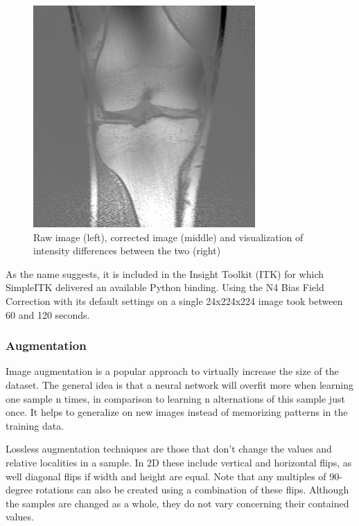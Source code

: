 \begin{figure}[H]
\endminipage\hfill
{}%
  \includegraphics[width=\linewidth]{imgs/diff2.jpg}
\endminipage
\caption{Raw image (left), corrected image (middle) and visualization of intensity differences between the two (right)}
\end{figure}

As the name suggests, it is included in the Insight Toolkit (ITK) for which SimpleITK delivered an available Python binding. Using the N4 Bias Field Correction with its default settings on a single 24x224x224 image took between 60 and 120 seconds.

\subsubsection{Augmentation}

Image augmentation is a popular approach to virtually increase the size of the dataset. The general idea is that a neural network will overfit more when learning one sample n times, in comparison to learning n alternations of this sample just once. It helps to generalize on new images instead of memorizing patterns in the training data.

Lossless augmentation techniques are those that don't change the values and relative localities in a sample. In 2D these include vertical and horizontal flips, as well diagonal flips if width and height are equal. Note that any multiples of 90-degree rotations can also be created using a combination of these flips. Although the samples are changed as a whole, they do not vary concerning their contained values. 

